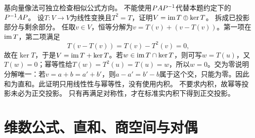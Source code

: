 {基向量像法可独立检查相似公式方向。}
{不能使用$PAP^{-1}$代替本题约定下的$P^{-1} AP$。}
{设$T:V\to V$为线性变换且$T^2=T$，证明$V=\operatorname{im} T\oplus\ker T$。}
{拆成已投影部分与剩余部分。}
{任取$v\in V$，恒等分解为$v=T(v)+(v-T(v))$。第一项在$\operatorname{im} T$，第二项满足
\[T(v-T(v))=T(v)-T^2(v)=0,\]
故在$\ker T$，于是$V=\operatorname{im} T+\ker T$。若$w\in\operatorname{im} T\cap\ker T$，则可写$w=T(u)$，又$T(w)=0$；幂等性给$T(w)=T^2(u)=T(u)=w$，所以$w=0$。交为零说明分解唯一：若$v=a+b=a'+b'$，则$a-a'=b'-b$属于这个交，只能为零。因此和为直和。此证明只用线性性与幂等性，没有使用内积。}
{不要求内积，故幂等投影未必为正交投影。}
{只有再满足对称性，才在标准实内积下得到正交投影。}
\section{维数公式、直和、商空间与对偶}
